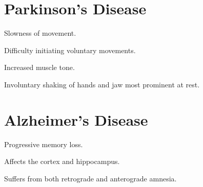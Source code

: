 \hypertarget{parkinson}{}
\section{Parkinson's Disease}
\begin{coloredlist}
    \item {}
    \begin{coloredlist}
        \item Slowness of movement.
    \end{coloredlist}
    \item {}
    \begin{coloredlist}
        \item Difficulty initiating voluntary movements.
    \end{coloredlist}
    \item {}
    \begin{coloredlist}
        \item Increased muscle tone.
    \end{coloredlist}
    \item {}
    \begin{coloredlist}
        \item Involuntary shaking of hands and jaw most prominent at rest.
    \end{coloredlist}
\end{coloredlist}

\section{Alzheimer's Disease}

\begin{coloredlist}
    \item Progressive memory loss.
    \item Affects the cortex and hippocampus.
    \item Suffers from both retrograde and anterograde amnesia.
\end{coloredlist}


